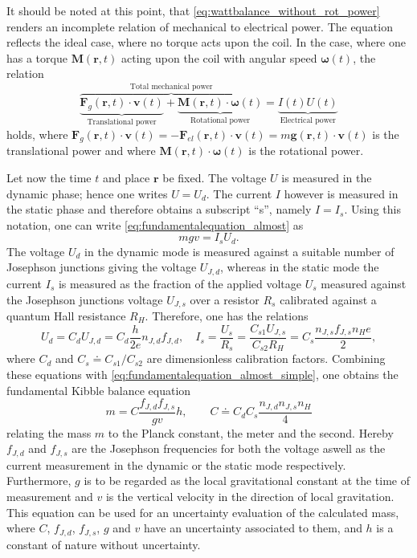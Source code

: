 \documentclass{report}
\numberwithin{tm}{section}
\newcommand\vect[1]{\ensuremath{\bm{#1}}}
\begin{document}
It should be noted at this point, that \cref{eq:wattbalance_without_rot_power} renders an incomplete relation of mechanical to electrical power. The equation reflects the ideal case, where no torque acts upon the coil. In the case, where one has a torque $\vect{M}(\vect{r},t)$ acting upon the coil with angular speed $\vect{\omega}(t)$, the relation \begin{equation}\label{eq:joulebalancederivation_fund}
	\overbrace{\underbrace{\vect{F}_{g}(\vect{r},t)\cdot \vect{v}(t)}_{\text{Translational power}} + \underbrace{\vect{M}(\vect{r},t)\cdot \vect{\omega}(t)}_{\text{Rotational power}}}^\text{Total mechanical power} = \underbrace{I(t) U(t)}_{\text{Electrical power}}
\end{equation} holds, where $\vect{F}_{g}(\vect{r},t) \cdot \vect{v}(t) = -\vect{F}_{el}(\vect{r},t) \cdot \vect{v}(t) = m\vect{g}(\vect{r},t)\cdot \vect{v}(t)$ is the translational power and where $\vect{M}(\vect{r},t) \cdot \vect{\omega}(t)$ is the rotational power.

Let now the time $t$ and place $\vect{r}$ be fixed. The voltage $U$ is measured in the dynamic phase; hence one writes $U = U_d$. The current $I$ however is measured in the static phase and therefore obtains a subscript ``s'', namely $I=I_s$. Using this notation, one can write \cref{eq:fundamentalequation_almost} as \begin{equation}\label{eq:fundamentalequation_almost_simple}
	mgv = I_sU_d.
\end{equation}The voltage $U_d$ in the dynamic mode is measured against a suitable number of Josephson junctions giving the voltage $U_{J,d}$, whereas in the static mode the current $I_{s}$ is measured as the fraction of the applied voltage $U_{s}$ measured against the Josephson junctions voltage $U_{J,s}$ over a resistor $R_s$ calibrated against a quantum Hall resistance $R_H$. Therefore, one has the relations \begin{equation} \label{eq:quantum_josephson}
U_d = C_dU_{J,d} = C_d\frac{h}{2e}n_{J,d}f_{J,d}, \quad I_s = \frac{U_s}{R_s} = \frac{C_{s1}U_{J,s}}{C_{s2}R_H} = C_s\frac{n_{J,s} f_{J,s} n_He}{2},
\end{equation} where $C_d$ and $C_s \doteq C_{s1}/C_{s2}$ are dimensionless calibration factors. Combining these equations with \cref{eq:fundamentalequation_almost_simple}, one obtains the fundamental Kibble balance equation \begin{equation}
m = C\frac{f_{J,d}f_{J,s}}{gv}h, \qquad C \doteq C_dC_s\frac{n_{J,d}n_{J,s} n_H}{4}
\end{equation} relating the mass $m$ to the Planck constant, the meter and the second. Hereby $f_{J,d}$ and $f_{J,s}$ are the Josephson frequencies for both the voltage aswell as the current measurement in the dynamic or the static mode respectively. Furthermore, $g$ is to be regarded as the local gravitational constant at the time of measurement and $v$ is the vertical velocity in the direction of local gravitation. This equation can be used for an uncertainty evaluation of the calculated mass, where $C$, $f_{J,d}$, $f_{J,s}$, $g$ and $v$ have an uncertainty associated to them, and $h$ is a constant of nature without uncertainty.
\end{document}
